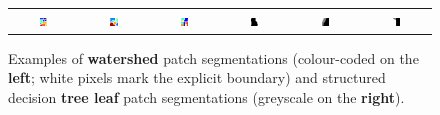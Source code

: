 \begin{figure}[ht!]
\begin{center}
\begin{tabular}{ c c c c c c }
  \includegraphics[width=0.13\textwidth,frame]{images/SE-SV-UCM/watershed-patches/watershed-patch13.png} &
  \includegraphics[width=0.13\textwidth,frame]{images/SE-SV-UCM/watershed-patches/watershed-patch14.png} &
  \includegraphics[width=0.13\textwidth,frame]{images/SE-SV-UCM/watershed-patches/watershed-patch15.png} &
  \includegraphics[width=0.13\textwidth,frame]{images/SE-SV-UCM/leaf-patches/leaf-patch-3-segms1.png} &
  \includegraphics[width=0.13\textwidth,frame]{images/SE-SV-UCM/leaf-patches/leaf-patch-3-segms2.png} &
  \includegraphics[width=0.13\textwidth,frame]{images/SE-SV-UCM/leaf-patches/leaf-patch-3-segms3.png} \\
  \end{tabular}
\end{center}
\caption{Examples of {\bf watershed} patch segmentations (colour-coded on the {\bf left}; white pixels mark the explicit boundary) and structured decision {\bf tree leaf} patch segmentations (greyscale on the {\bf right}).}
\label{fig:watershed-and-leaf-patches}
\end{figure}

